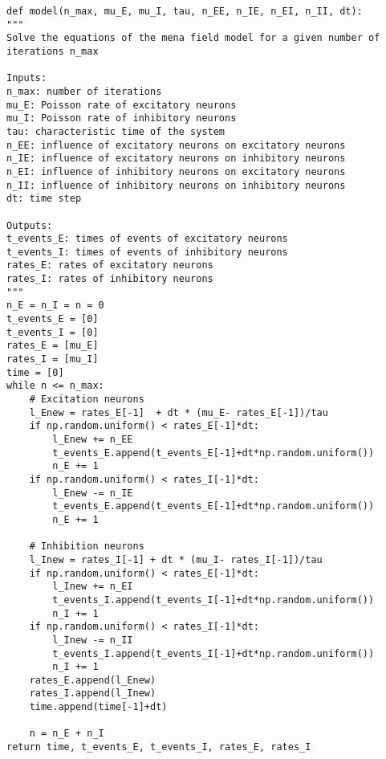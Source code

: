 \begin{lstlisting}[caption = {Modelo.}, label = {lst:}]
def model(n_max, mu_E, mu_I, tau, n_EE, n_IE, n_EI, n_II, dt):
"""
Solve the equations of the mena field model for a given number of iterations n_max

Inputs:
n_max: number of iterations
mu_E: Poisson rate of excitatory neurons
mu_I: Poisson rate of inhibitory neurons
tau: characteristic time of the system
n_EE: influence of excitatory neurons on excitatory neurons
n_IE: influence of excitatory neurons on inhibitory neurons
n_EI: influence of inhibitory neurons on excitatory neurons
n_II: influence of inhibitory neurons on inhibitory neurons
dt: time step

Outputs:
t_events_E: times of events of excitatory neurons
t_events_I: times of events of inhibitory neurons
rates_E: rates of excitatory neurons
rates_I: rates of inhibitory neurons
"""
n_E = n_I = n = 0
t_events_E = [0]
t_events_I = [0]
rates_E = [mu_E]
rates_I = [mu_I]
time = [0]
while n <= n_max:
    # Excitation neurons
    l_Enew = rates_E[-1]  + dt * (mu_E- rates_E[-1])/tau
    if np.random.uniform() < rates_E[-1]*dt:
        l_Enew += n_EE
        t_events_E.append(t_events_E[-1]+dt*np.random.uniform())
        n_E += 1
    if np.random.uniform() < rates_I[-1]*dt:
        l_Enew -= n_IE
        t_events_E.append(t_events_E[-1]+dt*np.random.uniform())
        n_E += 1

    # Inhibition neurons
    l_Inew = rates_I[-1] + dt * (mu_I- rates_I[-1])/tau
    if np.random.uniform() < rates_E[-1]*dt:
        l_Inew += n_EI
        t_events_I.append(t_events_I[-1]+dt*np.random.uniform())
        n_I += 1
    if np.random.uniform() < rates_I[-1]*dt:
        l_Inew -= n_II
        t_events_I.append(t_events_I[-1]+dt*np.random.uniform())
        n_I += 1
    rates_E.append(l_Enew)
    rates_I.append(l_Inew)
    time.append(time[-1]+dt)

    n = n_E + n_I
return time, t_events_E, t_events_I, rates_E, rates_I
\end{lstlisting}